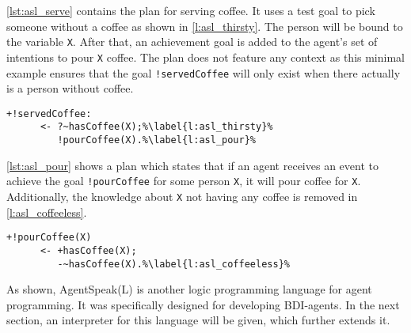 \autoref{lst:asl_serve} contains the plan for serving coffee.
It uses a test goal to pick someone without a coffee as shown in \autoref{l:asl_thirsty}.
The person will be bound to the variable \texttt{X}.
After that, an achievement goal is added to the agent's set of intentions to pour \texttt{X} coffee.
The plan does not feature any context as this minimal example ensures that the goal \texttt{!servedCoffee} will only exist when there actually is a person without coffee.
\begin{lstlisting}[firstnumber=10, caption={Definition of the \texttt{servedCoffee} plan.}, label=lst:asl_serve]
  +!servedCoffee:
      <- ?~hasCoffee(X);%\label{l:asl_thirsty}%
         !pourCoffee(X).%\label{l:asl_pour}%
\end{lstlisting}
\autoref{lst:asl_pour} shows a plan which states that if an agent receives an event to achieve the goal \texttt{!pourCoffee} for some person \texttt{X}, it will pour coffee for \texttt{X}.
Additionally, the knowledge about \texttt{X} not having any coffee is removed in \autoref{l:asl_coffeeless}.
\begin{lstlisting}[firstnumber=14, caption={Definition of the \texttt{pourCoffee} plan.}, label=lst:asl_pour]
  +!pourCoffee(X)
      <- +hasCoffee(X);
         -~hasCoffee(X).%\label{l:asl_coffeeless}%
\end{lstlisting}

As shown, AgentSpeak(L) is another logic programming language for agent programming.
It was specifically designed for developing BDI-agents.
In the next section, an interpreter for this language will be given, which further extends it.
